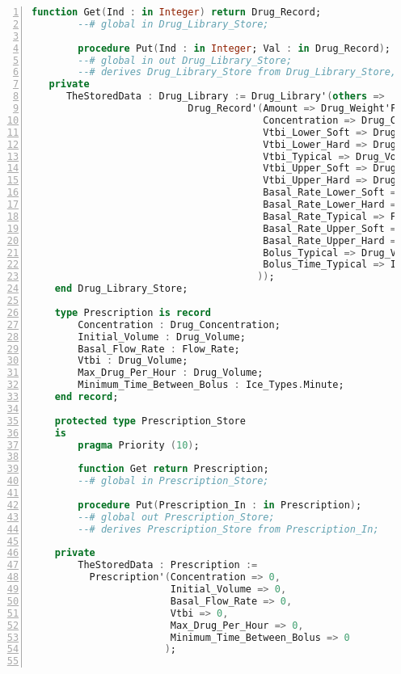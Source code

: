 \begin{lstlisting}[language=ada, gobble=0, numbers=left, caption={\lstinline{Pca_Types} package}]
        function Get(Ind : in Integer) return Drug_Record;
        --# global in Drug_Library_Store;

        procedure Put(Ind : in Integer; Val : in Drug_Record);
        --# global in out Drug_Library_Store;
        --# derives Drug_Library_Store from Drug_Library_Store, Ind, Val;
   private
      TheStoredData : Drug_Library := Drug_Library'(others =>        
                           Drug_Record'(Amount => Drug_Weight'First,
                                        Concentration => Drug_Concentration'First,
                                        Vtbi_Lower_Soft => Drug_Volume'First,
                                        Vtbi_Lower_Hard => Drug_Volume'First,
                                        Vtbi_Typical => Drug_Volume'First,
                                        Vtbi_Upper_Soft => Drug_Volume'First,
                                        Vtbi_Upper_Hard => Drug_Volume'First,
                                        Basal_Rate_Lower_Soft => Flow_Rate'First,
                                        Basal_Rate_Lower_Hard => Flow_Rate'First,
                                        Basal_Rate_Typical => Flow_Rate'First,
                                        Basal_Rate_Upper_Soft => Flow_Rate'First,
                                        Basal_Rate_Upper_Hard => Flow_Rate'First,
                                        Bolus_Typical => Drug_Volume'First,
                                        Bolus_Time_Typical => Ice_Types.Minute'First
                                       ));
    end Drug_Library_Store;

    type Prescription is record
        Concentration : Drug_Concentration;
        Initial_Volume : Drug_Volume;
        Basal_Flow_Rate : Flow_Rate;
        Vtbi : Drug_Volume;
        Max_Drug_Per_Hour : Drug_Volume;
        Minimum_Time_Between_Bolus : Ice_Types.Minute;
    end record;

    protected type Prescription_Store
    is
        pragma Priority (10);

        function Get return Prescription;
        --# global in Prescription_Store;

        procedure Put(Prescription_In : in Prescription);
        --# global out Prescription_Store;
        --# derives Prescription_Store from Prescription_In;

    private
        TheStoredData : Prescription :=
          Prescription'(Concentration => 0,
                        Initial_Volume => 0,
                        Basal_Flow_Rate => 0,
                        Vtbi => 0,
                        Max_Drug_Per_Hour => 0,
                        Minimum_Time_Between_Bolus => 0
                       );


\end{lstlisting}
